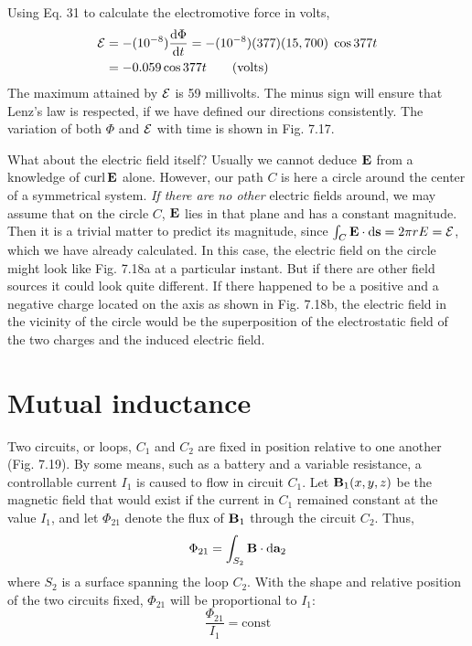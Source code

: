 Using Eq. 31 to calculate the electromotive force in volts,
\begin{align}
  \mathcal{E} &= -(10^{-8})\frac{\textup{d}\Phi}{\textup{d} t} = -(10^{-8})(377)(15,700)\;\cos 377 t \\
       &= -0.059\cos 377 t \qquad \text{(volts)}
\end{align}
The maximum attained by $\mathcal{E}$ is 59 millivolts. The minus sign will
ensure that Lenz's law is respected, if we have defined our directions
consistently. The variation of both $\Phi$ and $\mathcal{E}$ with time is shown in
Fig. 7.17.

What about the electric field itself? Usually we cannot deduce
$\mathbf{E}$ from a knowledge of $\operatorname{curl}\mathbf{E}$ alone. However, our path $C$ is here a
circle around the center of a symmetrical system. \emph{If there are no
other} electric fields around, we may assume that on the circle $C$, $\mathbf{E}$ lies
in that plane and has a constant magnitude. Then it is a trivial
matter to predict its magnitude, since $\int_C \mathbf{E}\cdot\textup{d}\mathbf{s} = 2\pi r E = \mathcal{E}$, which
we have already calculated. In this case, the electric field on the
circle might look like Fig. 7.18a at a particular instant. But if there
are other field sources it could look quite different. If there happened
to be a positive and a negative charge located on the axis as shown
in Fig. 7.18b, the electric field in the vicinity of the circle would be
the superposition of the electrostatic field of the two charges and the
induced electric field.


\section{Mutual inductance}

Two circuits, or loops, $C_1$ and $C_2$ are fixed in position relative to
one another (Fig. 7.19). By some means, such as a battery and
a variable resistance, a controllable current $I_1$ is caused to flow in
circuit $C_1$. Let $\mathbf{B}_1(x,y,z)$ be the magnetic field that would exist if
the current in $C_1$ remained constant at the value $I_1$, and let $\Phi_{21}$ denote
the flux of $\mathbf{B}_1$ through the circuit $C_2$. Thus,
\begin{equation}
  \Phi_{21} = \int_{S_2} \mathbf{B}\cdot\textup{d}\mathbf{a}_2
\end{equation}
where $S_2$ is a surface spanning the loop $C_2$. With the shape and
relative position of the two circuits fixed, $\Phi_{21}$ will be proportional
to $I_1$:
\begin{equation}
  \frac{\Phi_{21}}{I_1} = \text{const}
\end{equation}

